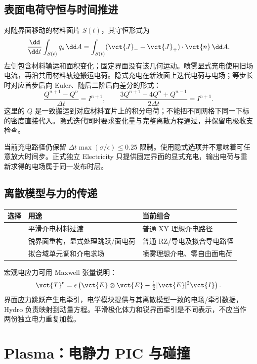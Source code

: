\documentclass[a4paper,11pt]{article}
\begin{document}
\subsection{表面电荷守恒与时间推进}
对随界面移动的材料面片 $S(t)$，其守恒形式为
\begin{equation}
\frac{\dd}{\dd t}\int_{S(t)}q_s\,\dd A
=\int_{S(t)}(\vct{J}_{-}-\vct{J}_{+})\cdot\vct{n}\,\dd A.
\end{equation}
左侧包含材料输运和面积变化；固定界面没有该几何运动。喷雾显式充电使用旧场电流，再沿共用材料轨迹搬运电荷。隐式充电在新液面上迭代电荷与电场；等步长时对应首步后向 Euler、随后二阶后向差分的形式：
\begin{equation}
\frac{Q^{n+1}-Q^n}{\Delta t}=I^{n+1},\qquad
\frac{3Q^{n+1}-4Q^n+Q^{n-1}}{2\Delta t}=I^{n+1}.
\end{equation}
这里的 $Q$ 是一致搬运到对应材料面片上的积分电荷；不能把不同网格下同一下标的密度直接代入。隐式迭代同时要求变化量与完整离散方程通过，并保留电极收支检查。

当前充电路径仍保留 $\Delta t\max(\sigma/\epsilon)\le0.25$ 限制。使用隐式选项并不意味着可任意放大时间步。正式独立 Electricity 只提供固定界面的显式充电，输出电荷与重新求得的电场属于同一发布时层。

\subsection{离散模型与力的传递}
\begin{longtable}{L{.26\linewidth}L{.32\linewidth}L{.34\linewidth}}
\toprule 选择 & 用途 & 当前组合 \\\midrule\endhead
{} & 平滑介电材料过渡 & 普通 XY 理想介电路径 \\
 & 锐界面重构，显式处理跳跃/面电荷 & 普通 RZ/导电及拟合导电路径 \\
 & 拟合域单元调和介电求场 & 喷雾理想介电、零自由面电荷 \\
\bottomrule
\end{longtable}
宏观电应力可用 Maxwell 张量说明：
\begin{equation}
\vct{T}^{e}=\epsilon\left(\vct{E}\otimes\vct{E}-\tfrac12|\vct{E}|^2\vct{I}\right).
\end{equation}
界面应力跳跃产生电牵引，电学模块提供与其离散模型一致的电场/牵引数据，Hydro 负责映射到动量方程。平滑极化体力和锐界面牵引是不同表示，不应当作两份独立电力重复加载。

\section{Plasma：电静力 PIC 与碰撞}
\end{document}
